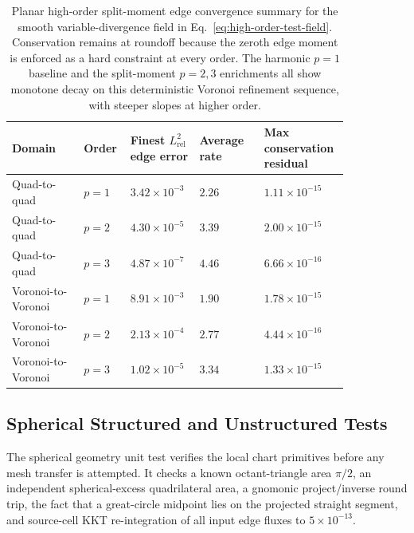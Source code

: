 \documentclass[11pt]{article}
\begin{document}
\begin{table}[t]
  \centering
  \small
  \begin{tabular}{@{}L{0.20\linewidth}L{0.10\linewidth}L{0.18\linewidth}L{0.18\linewidth}L{0.18\linewidth}@{}}
  \toprule
  Domain & Order & Finest \(L^2_{\mathrm{rel}}\) edge error & Average rate & Max conservation residual \\
  \midrule
  Quad-to-quad & \(p=1\) & \(3.42\times10^{-3}\) & \(2.26\) & \(1.11\times10^{-15}\) \\
  Quad-to-quad & \(p=2\) & \(4.30\times10^{-5}\) & \(3.39\) & \(2.00\times10^{-15}\) \\
  Quad-to-quad & \(p=3\) & \(4.87\times10^{-7}\) & \(4.46\) & \(6.66\times10^{-16}\) \\
  Voronoi-to-Voronoi & \(p=1\) & \(8.91\times10^{-3}\) & \(1.90\) & \(1.78\times10^{-15}\) \\
  Voronoi-to-Voronoi & \(p=2\) & \(2.13\times10^{-4}\) & \(2.77\) & \(4.44\times10^{-16}\) \\
  Voronoi-to-Voronoi & \(p=3\) & \(1.02\times10^{-5}\) & \(3.34\) & \(1.33\times10^{-15}\) \\
  \bottomrule
  \end{tabular}
  \caption{Planar high-order split-moment edge convergence summary for the
  smooth variable-divergence field in Eq.~\eqref{eq:high-order-test-field}.
  Conservation remains at roundoff because the zeroth edge moment is enforced
  as a hard constraint at every order.  The harmonic \(p=1\) baseline and the
  split-moment \(p=2,3\) enrichments all show monotone decay on this
  deterministic Voronoi refinement sequence, with steeper slopes at higher
  order.}
  \label{tab:high-order-hdiv}
\end{table}

\subsection{Spherical Structured and Unstructured Tests}

The spherical geometry unit test verifies the local chart primitives before any
mesh transfer is attempted.  It checks a known octant-triangle area
\(\pi/2\), an independent spherical-excess quadrilateral area, a
gnomonic project/inverse round trip, the fact that a great-circle midpoint lies
on the projected straight segment, and source-cell KKT re-integration of all
input edge fluxes to \(5\times10^{-13}\).
\end{document}
